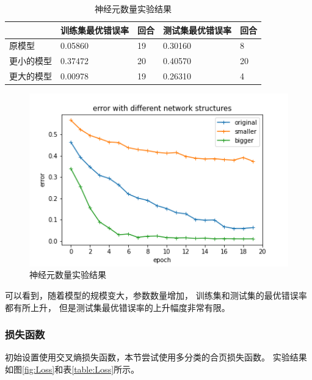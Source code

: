 \documentclass{article}
\begin{document}
\begin{table}[h]
\centering
\begin{tabular}{|l|l|l|l|l|} 
\hline
& 训练集最优错误率 & 回合 & 测试集最优错误率 & 回合 \\
\hline
原模型 & 0.05860 & 19 & 0.30160 & 8 \\
更小的模型 & 0.37472 & 20 & 0.40570 & 20 \\
更大的模型 & 0.00978 & 19 & 0.26310 & 4 \\
\hline
\end{tabular}
\caption{神经元数量实验结果}
\label{table:SizeResult}
\end{table}

\begin{figure}[h]
\includegraphics[width=\textwidth]
{Result/NN bigger/figure.png}
\caption{神经元数量实验结果}
\label{fig:Size}
\end{figure}

可以看到，随着模型的规模变大，参数数量增加，
训练集和测试集的最优错误率都有所上升，
但是测试集最优错误率的上升幅度非常有限。

\subsubsection{损失函数}

初始设置使用交叉熵损失函数，本节尝试使用多分类的合页损失函数。
实验结果如图\ref{fig:Loss}和表\ref{table:Loss}所示。
\end{document}
